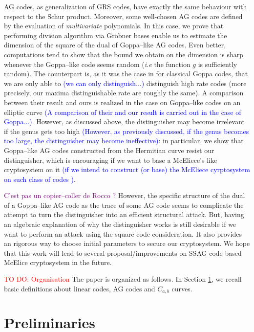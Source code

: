 \documentclass[a4paper]{article}
\theoremstyle{definition}
\theoremstyle{remark}
\newcommand\jade[1]{\textcolor{purple}{#1}}
\newcommand\TODO[1]{\textcolor{red}{TO DO: #1}}
\newcommand\sabira[1]{\textcolor{blue}{#1}}
\begin{document}
AG codes, as generalization of GRS codes, have exactly the same behaviour with respect to the Schur product. Moreover, some well-chosen AG codes are defined by the evaluation of \textit{multivariate} polynomials. In this case, we prove that performing division algorithm via Gröbner bases enable us to estimate the dimension of the square of the dual of Goppa--like AG codes. Even better, computations tend to show that the bound we obtain on the dimension is sharp whenever the Goppa--like code seems random (\emph{i.e} the function $g$ is sufficiently random). The counterpart is, as it was the case in \cite{MT21} for classical Goppa codes, that we are only able to \sabira{(we can only distinguish...)} distinguish high rate codes (more precisely, our maxima distinguishable rate are roughly the same). A comparison between their result and ours is realized in the case on Goppa--like codes on an elliptic curve \sabira{(A comparison of their and our result is carried out in the case of Goppa...)}. However, as discussed above, the distinguisher may become irrelevant if the genus gets too high \sabira{(However, as previously discussed, if the genus becomes too large, the distinguisher may become ineffective)}: in particular, we show that Goppa--like AG codes constructed from the Hermitian curve resist our distinguisher, which is encouraging if we want to base a McEliece's like cryptosystem on it \sabira{(if we intend to construct (or base) the McEliece cyrptosystem on such class of codes )}.

\jade{C'est pas un copier--coller de Rocco ?} However, the specific structure of the dual of a Goppa--like AG code as the trace of some AG code seems to complicate the attempt to turn the distinguisher into an efficient structural attack. But, having an algebraic explanation of why the distinguisher works is still desirable if we want to perform an attack using the square code consideration. It also provides an rigorous way to choose initial parameters to secure our cryptosystem.
We hope that this work will lead to several proposal/improvements on SSAG code based McElice cryptosystem in the future.

\TODO{Organisation}
The paper is organized as follows. In Section \ref{sec:preli}, we recall basic definitions about linear codes, AG codes and $C_{a,b}$ curves.


\section{Preliminaries}\label{sec:preli}
\end{document}
